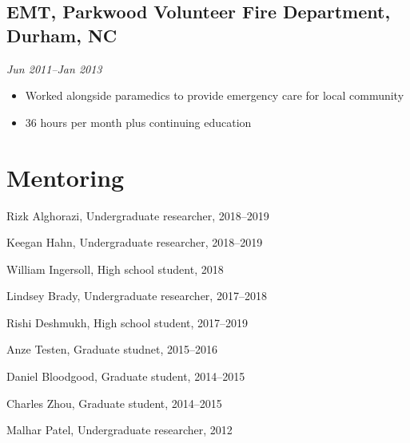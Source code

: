\documentclass{article}
\newcommand{\dateformat}[1]{\textit{#1}}
\begin{document}
  \subsection*{EMT, Parkwood Volunteer Fire Department, Durham, NC}
    \dateformat{Jun 2011--Jan 2013}
    \begin{itemize}
      \item Worked alongside paramedics to provide emergency care for local community
      \item 36 hours per month plus continuing education
    \end{itemize}
    

\section*{Mentoring}
  \begin{description}
    \item Rizk Alghorazi, Undergraduate researcher, 2018--2019
    \item Keegan Hahn, Undergraduate researcher, 2018--2019
    \item William Ingersoll, High school student, 2018
    \item Lindsey Brady, Undergraduate researcher, 2017--2018
    \item Rishi Deshmukh, High school student, 2017--2019
    \item Anze Testen, Graduate studnet, 2015--2016
    \item Daniel Bloodgood, Graduate student, 2014--2015
    \item Charles Zhou, Graduate student, 2014--2015
    \item Malhar Patel, Undergraduate researcher, 2012
  \end{description}
\end{document}
